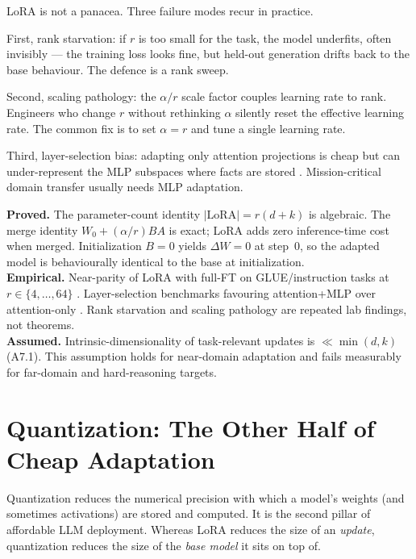 LoRA is not a panacea. Three failure modes recur in practice.

First, rank starvation: if $r$ is too small for the task, the model
underfits, often invisibly --- the training loss looks fine, but
held-out generation drifts back to the base behaviour. The
defence is a rank sweep.

Second, scaling pathology: the $\alpha/r$ scale factor couples
learning rate to rank. Engineers who change $r$ without rethinking
$\alpha$ silently reset the effective learning rate. The common fix
is to set $\alpha = r$ and tune a single learning rate.

Third, layer-selection bias: adapting only attention projections is
cheap but can under-represent the MLP subspaces where facts are
stored \citep{geva2021keyvalue}. Mission-critical domain transfer
usually needs MLP adaptation.

\begin{provedassumed}
\textbf{Proved.} The parameter-count identity
$|\text{LoRA}| = r(d+k)$ is algebraic. The merge identity
$W_0 + (\alpha/r)BA$ is exact; LoRA adds zero inference-time cost
when merged. Initialization $B=0$ yields $\Delta W = 0$ at step~0,
so the adapted model is behaviourally identical to the base at
initialization.\\
\textbf{Empirical.} Near-parity of LoRA with full-FT on
GLUE/instruction tasks at $r \in \{4,\dots,64\}$
\citep{hu2021lora}. Layer-selection benchmarks favouring
attention+MLP over attention-only \citep{hu2021lora,
raschka2023finetuning}. Rank starvation and scaling pathology are
repeated lab findings, not theorems.\\
\textbf{Assumed.} Intrinsic-dimensionality of task-relevant updates
is $\ll \min(d,k)$ (A7.1). This assumption holds for near-domain
adaptation and fails measurably for far-domain and
hard-reasoning targets.
\end{provedassumed}

\section{Quantization: The Other Half of Cheap Adaptation}

Quantization reduces the numerical precision with which a model's
weights (and sometimes activations) are stored and computed. It is
the second pillar of affordable LLM deployment. Whereas LoRA reduces
the size of an \emph{update}, quantization reduces the size of the
\emph{base model} it sits on top of.

